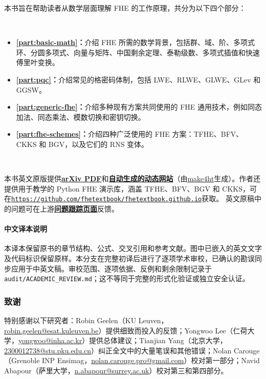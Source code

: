 \documentclass[11pt]{article}
\begin{document}
本书旨在帮助读者从数学层面理解 FHE 的工作原理，共分为以下四个部分：

$ $

\begin{itemize}
\item \textbf{\autoref{part:basic-math}：}介绍 FHE 所需的数学背景，包括群、域、阶、多项式环、分圆多项式、向量与矩阵、中国剩余定理、泰勒级数、多项式插值和快速傅里叶变换。

\item \textbf{\autoref{part:pqc}：}介绍常见的格密码体制，包括 LWE、RLWE、GLWE、GLev 和 GGSW。

\item \textbf{\textbf{\autoref{part:generic-fhe}：}}介绍多种现有方案共同使用的 FHE 通用技术，例如同态加法、同态乘法、模数切换和密钥切换。


\item \textbf{\textbf{\autoref{part:fhe-schemes}：}}介绍四种广泛使用的 FHE 方案：TFHE、BFV、CKKS 和 BGV，以及它们的 RNS 变体。
\end{itemize}

$ $



本书英文原版提供\href{https://arxiv.org/abs/2503.05136}{\textbf{arXiv PDF}}和\href{https://fhetextbook.github.io}{\textbf{自动生成的动态网站}}（由\href{https://www.kodymirus.cz/overleaf-html-sample/main.html}{make4ht}生成）。作者还提供用于教学的 Python FHE 演示库，涵盖 TFHE、BFV、BGV 和 CKKS，可在\href{https://github.com/fhetextbook/fhetextbook.github.io}{\texttt{https://github.com/fhetextbook/fhetextbook.github.io}}获取。
英文原稿中的问题可在上游\href{https://github.com/fhetextbook/fhetextbook.github.io/issues}{\textbf{问题跟踪页面}}反馈。
\paragraph*{中文译本说明} 本译本保留原书的章节结构、公式、交叉引用和参考文献。图中已嵌入的英文文字及代码标识保留原样。本分支在完整初译后进行了逐项学术审校，已确认的勘误同步应用于中英文稿。审校范围、逐项依据、反例和剩余限制记录于 \texttt{audit/ACADEMIC\_REVIEW.md}；这不等同于完整的形式化验证或独立安全认证。



\subsubsection*{致谢}
特别感谢以下研究者：Robin Geelen（KU Leuven，\href{mailto:robin.geelen@esat.kuleuven.be}{robin.geelen@esat.kuleuven.be}）提供细致而投入的反馈；Yongwoo Lee（仁荷大学，\href{mailto:yongwoo@inha.ac.kr}{yongwoo@inha.ac.kr}）提供总体建议；Tianjian Yang（北京大学，\href{mailto:2300012738@stu.pku.edu.cn}{2300012738@stu.pku.edu.cn}）纠正全文中的大量笔误和其他错误；Nolan Carouge（Grenoble INP Ensimag，\href{mailto:nolan.carouge.pro@gmail.com}{nolan.carouge.pro@gmail.com}）校对第一部分；Navid Abapour（萨里大学，\href{mailto:n.abapour@surrey.ac.uk}{n.abapour@surrey.ac.uk}）校对第三和第四部分。
\end{document}
